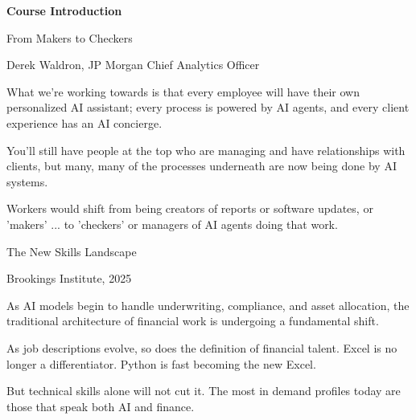\documentclass[aspectratio=169]{beamer}
\begin{document}

\begin{frame}[plain]
\vfill
\begin{center}
{\fontsize{26}{30}\selectfont\bfseries\color{titlegray} Course Introduction}
\end{center}
\vfill
\end{frame}

\begin{frame}{From Makers to Checkers}
\begin{shadedbox}\centerline{Derek Waldron, JP Morgan Chief Analytics Officer}\end{shadedbox}

What we're working towards is that every employee will have their own personalized AI assistant; every process is powered by AI agents, and every client experience has an AI concierge.

You'll still have people at the top who are managing and have relationships with clients, but many, many of the processes underneath are now being done by AI systems.

Workers would shift from being creators of reports or software updates, or 'makers' ... to 'checkers' or managers of AI agents doing that work.
\end{frame}

\begin{frame}{The New Skills Landscape}
\begin{shadedbox}\centerline{Brookings Institute, 2025}\end{shadedbox}

As AI models begin to handle underwriting, compliance, and asset allocation, the traditional architecture of financial work is undergoing a fundamental shift.

As job descriptions evolve, so does the definition of financial talent. Excel is no longer a differentiator. Python is fast becoming the new Excel.

But technical skills alone will not cut it. The most in demand profiles today are those that speak both AI and finance.
\end{frame}
\end{document}
